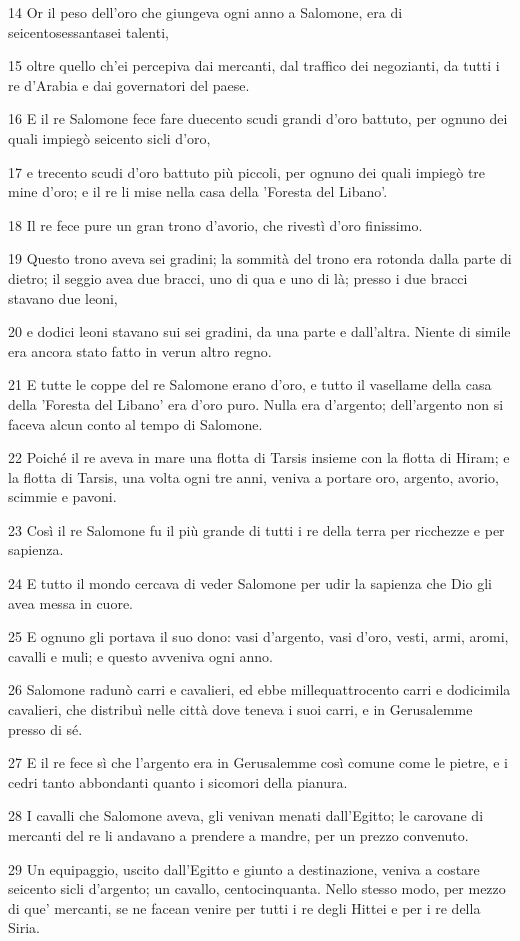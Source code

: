 \par 14 Or il peso dell'oro che giungeva ogni anno a Salomone, era di seicentosessantasei talenti,
\par 15 oltre quello ch'ei percepiva dai mercanti, dal traffico dei negozianti, da tutti i re d'Arabia e dai governatori del paese.
\par 16 E il re Salomone fece fare duecento scudi grandi d'oro battuto, per ognuno dei quali impiegò seicento sicli d'oro,
\par 17 e trecento scudi d'oro battuto più piccoli, per ognuno dei quali impiegò tre mine d'oro; e il re li mise nella casa della 'Foresta del Libano'.
\par 18 Il re fece pure un gran trono d'avorio, che rivestì d'oro finissimo.
\par 19 Questo trono aveva sei gradini; la sommità del trono era rotonda dalla parte di dietro; il seggio avea due bracci, uno di qua e uno di là; presso i due bracci stavano due leoni,
\par 20 e dodici leoni stavano sui sei gradini, da una parte e dall'altra. Niente di simile era ancora stato fatto in verun altro regno.
\par 21 E tutte le coppe del re Salomone erano d'oro, e tutto il vasellame della casa della 'Foresta del Libano' era d'oro puro. Nulla era d'argento; dell'argento non si faceva alcun conto al tempo di Salomone.
\par 22 Poiché il re aveva in mare una flotta di Tarsis insieme con la flotta di Hiram; e la flotta di Tarsis, una volta ogni tre anni, veniva a portare oro, argento, avorio, scimmie e pavoni.
\par 23 Così il re Salomone fu il più grande di tutti i re della terra per ricchezze e per sapienza.
\par 24 E tutto il mondo cercava di veder Salomone per udir la sapienza che Dio gli avea messa in cuore.
\par 25 E ognuno gli portava il suo dono: vasi d'argento, vasi d'oro, vesti, armi, aromi, cavalli e muli; e questo avveniva ogni anno.
\par 26 Salomone radunò carri e cavalieri, ed ebbe millequattrocento carri e dodicimila cavalieri, che distribuì nelle città dove teneva i suoi carri, e in Gerusalemme presso di sé.
\par 27 E il re fece sì che l'argento era in Gerusalemme così comune come le pietre, e i cedri tanto abbondanti quanto i sicomori della pianura.
\par 28 I cavalli che Salomone aveva, gli venivan menati dall'Egitto; le carovane di mercanti del re li andavano a prendere a mandre, per un prezzo convenuto.
\par 29 Un equipaggio, uscito dall'Egitto e giunto a destinazione, veniva a costare seicento sicli d'argento; un cavallo, centocinquanta. Nello stesso modo, per mezzo di que' mercanti, se ne facean venire per tutti i re degli Hittei e per i re della Siria.

